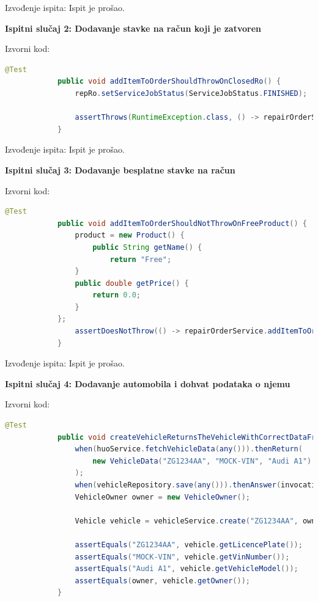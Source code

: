 			\noindent Izvođenje ispita: Ispit je prošao.
			
			\hfill\break
			\noindent\textbf{Ispitni slučaj 2: Dodavanje stavke na račun koji je zatvoren}
			
			\noindent Izvorni kod:
			
			\begin{lstlisting}[language=Java]
			@Test
			public void addItemToOrderShouldThrowOnClosedRo() {
				repRo.setServiceJobStatus(ServiceJobStatus.FINISHED);
			
				assertThrows(RuntimeException.class, () -> repairOrderService.addItemToOrder(repRo, product));
			}
			\end{lstlisting}
			
			\noindent Izvođenje ispita: Ispit je prošao.

			\hfill\break
			\noindent\textbf{Ispitni slučaj 3: Dodavanje besplatne stavke na račun}
			
			\noindent Izvorni kod:
			
			\begin{lstlisting}[language=Java]
			@Test
			public void addItemToOrderShouldNotThrowOnFreeProduct() {
				product = new Product() {
					public String getName() {
						return "Free";
				} 
				public double getPrice() {
					return 0.0;
				}
			};
				assertDoesNotThrow(() -> repairOrderService.addItemToOrder(repRo, product));
			}
			\end{lstlisting}
			
			\noindent Izvođenje ispita: Ispit je prošao.
			
			\hfill\break
			\noindent\textbf{Ispitni slučaj 4: Dodavanje automobila i dohvat podataka o njemu}
			
			\noindent Izvorni kod:
			
			\begin{lstlisting}[language=Java]
			@Test
			public void createVehicleReturnsTheVehicleWithCorrectDataFromHuoServiceAndOwner() throws HuoServiceException {
				when(huoService.fetchVehicleData(any())).thenReturn(
					new VehicleData("ZG1234AA", "MOCK-VIN", "Audi A1")
				);
				when(vehicleRepository.save(any())).thenAnswer(invocation -> invocation.getArgument(0));
				VehicleOwner owner = new VehicleOwner();
				
				Vehicle vehicle = vehicleService.create("ZG1234AA", owner);
				
				assertEquals("ZG1234AA", vehicle.getLicencePlate());
				assertEquals("MOCK-VIN", vehicle.getVinNumber());
				assertEquals("Audi A1", vehicle.getVehicleModel());
				assertEquals(owner, vehicle.getOwner());
			}
			\end{lstlisting}
			
